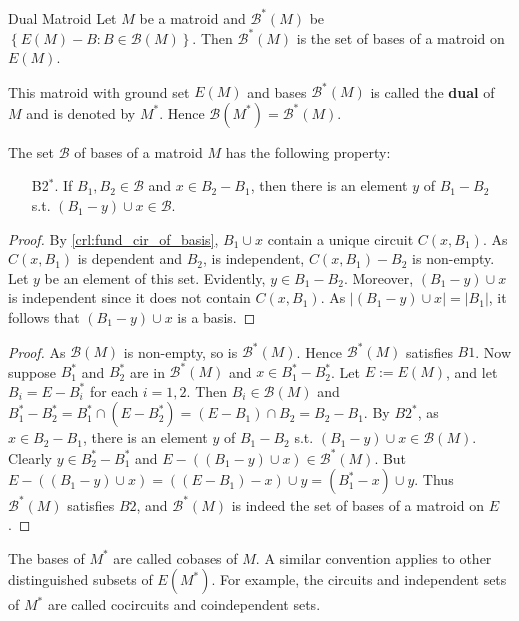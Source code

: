 \documentclass[a4paper,10pt]{article}
\renewcommand{\vocab}[1]{\textbf{#1}}
\newcommand{\BB}{\mathcal{B}}
\begin{document}
\begin{theorem}[thm:]{Dual Matroid}
  Let $M$ be a matroid and $\BB^*(M)$ be $\left\{E(M)-B:B\in \BB(M)\right\}$. Then $\BB^*(M)$ is the set of bases of a matroid on $E(M)$. 
  \begin{remark}
    This matroid with ground set $E(M)$ and bases $\BB^*(M)$ is called the \vocab{dual} of $M$ and is denoted by $M^*$. Hence $\BB(M^*)=\BB^*(M)$.
  \end{remark}
  \begin{lemma}[lem:]{}
    The set $\BB$ of bases of a matroid $M$ has the following property:
    \begin{enumerate}
      \item [B2$^*$.] If $B_1,B_2\in \BB$ and $x\in B_2-B_1$, then there is an element $y$ of $B_1-B_2$ s.t. $(B_1-y)\cup x\in \BB$.
    \end{enumerate}
    \begin{proof}
      By \cref{crl:fund_cir_of_basis}, $B_1\cup x$ contain a unique circuit $C(x,B_1)$. As $C(x,B_1)$ is dependent and $B_2$, is independent, $C(x,B_1)-B_2$ is non-empty. Let $y$ be an element of this set. Evidently, $y\in B_1-B_2$. Moreover, $(B_1-y)\cup x$ is independent since it does not contain $C(x,B_1)$. As $|(B_1-y)\cup x|=|B_1|$, it follows that $(B_1-y)\cup x$ is a basis.
    \end{proof}
  \end{lemma}
  \begin{proof}
    As $\BB(M)$ is non-empty, so is $\BB^*(M)$. Hence $\BB^*(M)$ satisfies $B1$. Now suppose $B_1^*$ and $B_2^*$ are in $\BB^*(M)$ and $x\in B_1^*-B_2^*$. Let $E:=E(M)$, and let $B_i=E-B_i^*$ for each $i=1,2$. Then $B_i\in \BB(M)$ and $B_1^*-B_2^*=B_1^*\cap (E-B_2^*)=(E-B_1)\cap B_2=B_2-B_1$. By $B2^*$, as $x\in B_2-B_1$, there is an element $y$ of $B_1-B_2$ s.t. $(B_1-y)\cup x\in \BB(M)$. Clearly $y\in B_2^*-B_1^*$ and $E-((B_1-y)\cup x)\in \BB^*(M)$. But $E-((B_1-y)\cup x)=((E-B_1)-x)\cup y=(B_1^*-x)\cup y$. Thus $\BB^*(M)$ satisfies $B2$, and $\BB^*(M)$ is indeed the set of bases of a matroid on $E$.
  \end{proof}
\end{theorem}

The bases of $M^*$ are called cobases of $M$. A similar convention applies to other distinguished subsets of $E(M^*)$. For example, the circuits and independent sets of $M^*$ are called cocircuits and coindependent sets. 
\end{document}
